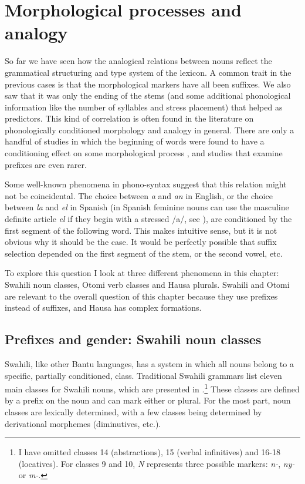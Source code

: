 \chapter{Morphological processes and analogy}\label{chap:structural}

So far we have seen how the analogical relations between nouns reflect the grammatical structuring and type system of the lexicon. A common trait in the previous cases is that the morphological markers have all been suffixes. We also saw that it was only the ending of the stems (and some additional phonological information like the number of syllables and stress placement) that helped as predictors. This kind of correlation is often found in the literature on phonologically conditioned morphology and analogy in general. There are only a handful of studies in which the beginning of words were found to have a conditioning effect on some morphological process \autocite{Bybee.1982, Kopcke.1984}, and studies that examine prefixes are even rarer.

Some well-known phenomena in phono-syntax suggest that this relation might not be coincidental. The choice between \textit{a} and \textit{an} in English, or the choice between \textit{la} and \textit{el} in Spanish (in Spanish feminine nouns can use the masculine definite article \textit{el} if they begin with a stressed /a/, see \citealt{Harris.1987}), are conditioned by the first segment of the following word. This makes intuitive sense, but it is not obvious why it should be the case. It would be perfectly possible that suffix selection depended on the first segment of the stem, or the second vowel, etc.

To explore this question I look at three different phenomena in this chapter: Swahili  noun classes, Otomi verb classes and Hausa plurals. Swahili and Otomi are relevant to the overall question of this chapter because they use prefixes instead of suffixes, and Hausa has complex  formations. %

\section{Prefixes and gender: Swahili noun classes}


Swahili, like other Bantu languages, has a  
system in which all nouns belong to a specific, partially conditioned, class. Traditional Swahili grammars list eleven main classes for Swahili nouns, which are presented in .\footnote{I have omitted classes 14 (abstractions), 15 (verbal infinitives) and 16-18 (locatives). For classes 9 and 10, \textit{N} represents three possible markers: \textit{n-}, \textit{ny-} or \textit{m-}.} These classes are defined by a prefix on the noun and can mark either  or plural. For the most part, noun classes are lexically determined, with a few classes being determined by derivational morphemes (diminutives, etc.). %

